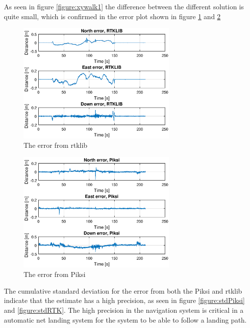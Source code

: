 As seen in figure \ref{figure:xywalk1} the difference between the different solution is quite small, which is confirmed in the error plot shown in figure \ref{figure:errorRTKwalk1} and \ref{figure:errorPiksiwalk1}
\begin{figure}[H]
	\centering
		\includegraphics[width=0.7\textwidth]{figs/plots/errorRtklibWalk1.eps}
		\caption{The error from \gls{rtklib}}
		\label{figure:errorRTKwalk1}
\end{figure}
\begin{figure}[H]
	\centering
		\includegraphics[width=0.7\textwidth]{figs/plots/errorPiksiWalk1.eps}
		\caption{The error from Piksi}
		\label{figure:errorPiksiwalk1}
\end{figure}
The cumulative standard deviation for the error from both the Piksi and \gls{rtklib} indicate that the estimate has a high precision, as seen in figure \ref{figure:stdPiksi} and \ref{figure:stdRTK}. The high precision in the navigation system is critical in a automatic net landing system for the system to be able to follow a landing path.
